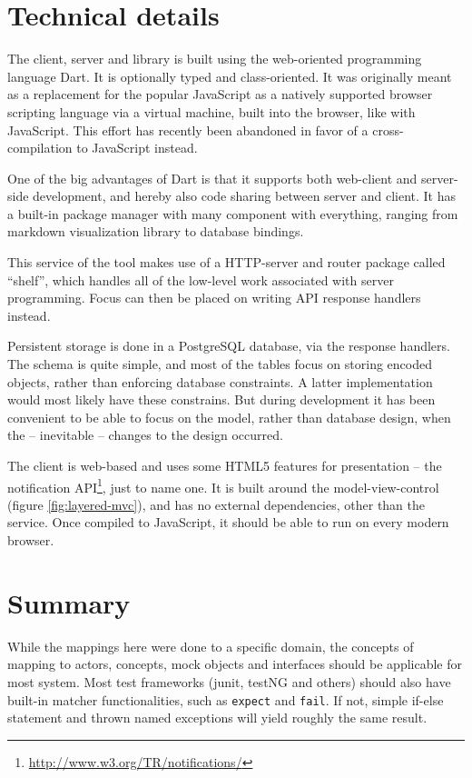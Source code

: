 \section{Technical details}
The client, server and library is built using the web-oriented programming language Dart. It is optionally typed and class-oriented. It was originally meant as a replacement for the popular JavaScript as a natively supported browser scripting language via a virtual machine, built into the browser, like with JavaScript. This effort has recently been abandoned in favor of a cross-compilation to JavaScript instead.\medskip

\noindent One of the big advantages of Dart is that it supports both web-client and server-side development, and hereby also code sharing between server and client. It has a built-in package manager with many component with everything, ranging from markdown visualization library to database bindings.\medskip

\noindent This service of the tool makes use of a HTTP-server and router package called ``shelf'', which handles all of the low-level work associated with server programming. Focus can then be placed on writing API response handlers instead.\medskip

\noindent Persistent storage is done in a PostgreSQL database, via the response handlers. The schema is quite simple, and most of the tables focus on storing encoded objects, rather than enforcing database constraints. A latter implementation would most likely have these constrains. But during development it has been convenient to be able to focus on the model, rather than database design, when the -- inevitable -- changes to the design occurred.\medskip

\noindent The client is web-based and uses some HTML5 features for presentation -- the notification API\footnote{\url{http://www.w3.org/TR/notifications/}}, just to name one. It is built around the model-view-control (figure \ref{fig:layered-mvc}), and has no external dependencies, other than the service. Once compiled to JavaScript, it should be able to run on every modern browser.

\section{Summary}
While the mappings here were done to a specific domain, the concepts of mapping to actors, concepts, mock objects and interfaces should be applicable for most system. Most test frameworks (junit, testNG and others) should also have built-in matcher functionalities, such as \texttt{expect} and \texttt{fail}. If not, simple if-else statement and thrown named exceptions will yield roughly the same result.\medskip

